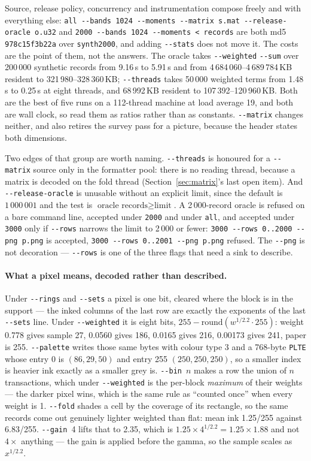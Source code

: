 \documentclass[11pt,a4paper]{article}
\newcommand{\flag}[1]{\texttt{-{}-#1}}
\begin{document}
Source, release policy, concurrency and instrumentation compose freely and with
everything else: \texttt{all -{}-bands 1024 -{}-moments -{}-matrix s.mat
-{}-release-oracle o.u32} and \texttt{2000 -{}-bands 1024 -{}-moments <
records} are both md5 \texttt{978c15f3b22a} over \texttt{synth2000}, and adding
\flag{stats} does not move it. The costs are the point of them, not the
answers. The oracle takes \flag{weighted} \flag{sum} over 200\,000 synthetic
records from 9.16\,s to 5.91\,s and from 4\,684\,060--4\,689\,784\,KB resident
to 321\,980--328\,360\,KB; \flag{threads} takes 50\,000 weighted terms from
1.48\,s to 0.25\,s at eight threads, and 68\,992\,KB resident to
107\,392--120\,960\,KB. Both are the best of five runs on a 112-thread
machine at load average 19, and both are wall clock, so read them as ratios
rather than as constants. \flag{matrix} changes neither, and also retires the survey
pass for a picture, because the header states both dimensions.

Two edges of that group are worth naming. \flag{threads} is honoured for a
\flag{matrix} source only in the formatter pool: there is no reading thread,
because a matrix is decoded on the fold thread (Section~\ref{sec:matrix}'s last
open item). And \flag{release-oracle} is unusable without an explicit limit,
since the default is $1\,000\,001$ and the test is
$\text{oracle records} \ge \text{limit}$. A 2\,000-record oracle is refused on
a bare command line, accepted under \texttt{2000} and under \texttt{all}, and
accepted under \texttt{3000} only if \flag{rows} narrows the limit to 2\,000
or fewer: \texttt{3000 -{}-rows 0..2000 -{}-png p.png} is accepted,
\texttt{3000 -{}-rows 0..2001 -{}-png p.png} refused. The \flag{png} is not
decoration --- \flag{rows} is one of the three flags that need a sink to
describe.

\paragraph{What a pixel means, decoded rather than described.} Under
\flag{rings} and \flag{sets} a pixel is one bit, cleared where the block is in
the support --- the inked columns of the last row are exactly the exponents of
the last \flag{sets} line. Under \flag{weighted} it is eight bits,
$255 - \mathrm{round}(w^{1/2.2}\cdot 255)$: weight 0.778 gives sample 27, 0.0560
gives 186, 0.0165 gives 216, 0.00173 gives 241, paper is 255. \flag{palette}
writes those same bytes with colour type 3 and a 768-byte \texttt{PLTE} whose
entry 0 is $(86,29,50)$ and entry 255 $(250,250,250)$, so a smaller index is
heavier ink exactly as a smaller grey is. \flag{bin}~$n$ makes a row the union of
$n$ transactions, which under \flag{weighted} is the per-block \emph{maximum} of
their weights --- the darker pixel wins, which is the same rule as ``counted
once'' when every weight is 1. \flag{fold} shades a cell by the coverage of its
rectangle, so the same records come out genuinely lighter weighted than flat:
mean ink 1.25/255 against 6.83/255. \flag{gain}~4 lifts that to 2.35, which is
$1.25 \times 4^{1/2.2} = 1.25 \times 1.88$ and not $4\times$ anything --- the
gain is applied before the gamma, so the sample scales as $x^{1/2.2}$.
\end{document}

